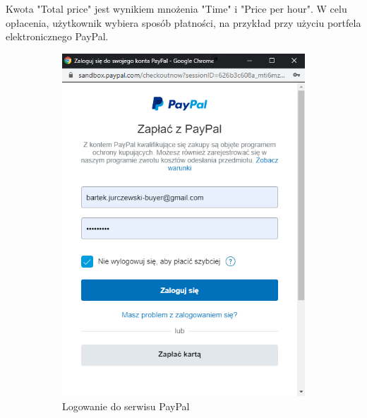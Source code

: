 \documentclass[12pt]{article}
\numberwithin{figure}{section}
\begin{document}
\begin{sloppypar}
Kwota "Total price" jest wynikiem mnożenia "Time" i "Price per hour". W celu opłacenia, użytkownik wybiera sposób płatności, na przykład przy użyciu portfela elektronicznego PayPal.

\begin{figure}[h]
    \centering
    \begin{subfigure}{.5\textwidth}
      \centering
      \includegraphics[width=.90\linewidth]{images/chapter_4/pay1.png}
      \caption{Logowanie do serwisu PayPal}
      \label{fig:paypal1}
    \end{subfigure}%
    \begin{subfigure}{.5\textwidth}
      \centering

\end{subfigure}
\end{figure}
\end{sloppypar}
\end{document}
